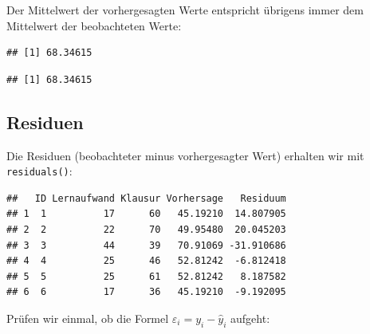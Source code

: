 \documentclass[
]{book}
\newenvironment{Shaded}{\begin{snugshade}}{\end{snugshade}}
\newcommand{\FunctionTok}[1]{\textcolor[rgb]{0.13,0.29,0.53}{\textbf{#1}}}
\newcommand{\NormalTok}[1]{#1}
\newcommand{\OtherTok}[1]{\textcolor[rgb]{0.56,0.35,0.01}{#1}}
\newcommand{\SpecialCharTok}[1]{\textcolor[rgb]{0.81,0.36,0.00}{\textbf{#1}}}
\begin{document}
Der Mittelwert der vorhergesagten Werte entspricht übrigens immer dem Mittelwert der beobachteten Werte:

\begin{Shaded}
\end{Shaded}

\begin{verbatim}
## [1] 68.34615
\end{verbatim}

\begin{Shaded}
\end{Shaded}

\begin{verbatim}
## [1] 68.34615
\end{verbatim}

\subsection{Residuen}\label{residuen}

Die Residuen (beobachteter minus vorhergesagter Wert) erhalten wir mit \texttt{residuals()}:

\begin{Shaded}
\end{Shaded}

\begin{verbatim}
##   ID Lernaufwand Klausur Vorhersage   Residuum
## 1  1          17      60   45.19210  14.807905
## 2  2          22      70   49.95480  20.045203
## 3  3          44      39   70.91069 -31.910686
## 4  4          25      46   52.81242  -6.812418
## 5  5          25      61   52.81242   8.187582
## 6  6          17      36   45.19210  -9.192095
\end{verbatim}

Prüfen wir einmal, ob die Formel \(\varepsilon_i=y_i - \hat{y}_i\) aufgeht:
\end{document}
